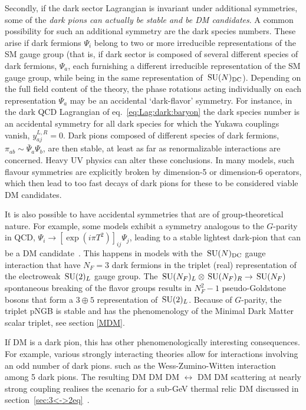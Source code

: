 Secondly, if the dark sector Lagrangian is invariant under additional symmetries, some of the {\em dark pions can actually be stable and be DM candidates}.
A common possibility for such an additional symmetry are the dark species numbers. 
These arise if dark fermions $\Psi_i$ belong to two or more irreducible representations of the SM gauge group 
(that is, if dark sector is composed of several different species  of dark fermions, $\Psi_a$, each furnishing a different irreducible representation of the SM gauge group, while being in the same representation of $\,{\rm SU}(N)_{\rm DC}$). 
Depending on the full field content of the theory, the phase rotations acting individually on each representation $\Psi_a$ may be an accidental  `dark-flavor' symmetry. 
For instance, in the dark QCD Lagrangian of eq.~\eqref{eq:Lag:dark:baryon} 
the dark species number is an accidental symmetry for all dark species for which 
the Yukawa couplings vanish, $y_{aj}^{L,R}=0$.
Dark pions composed of different species of dark fermions, $\pi_{ab}\sim \bar{\Psi}_a \Psi_b$, are then stable, 
at least as far as renormalizable interactions are concerned.
Heavy UV physics can alter these conclusions. 
In many models, such flavour symmetries are explicitly broken by 
 dimension-5 or dimension-6 operators, which then lead to too fast decays of dark pions for these to be considered viable DM candidates. 

\smallskip

It is also possible to have accidental symmetries that are of group-theoretical nature.
For example, some models exhibit a symmetry analogous to the $G$-parity in QCD,
$\Psi_i \to [\exp(i \pi T^2)]_{ij}\Psi_j$, leading to a stable lightest dark-pion that can be a DM candidate~\cite{BaryonicDM}.
This happens in models with the
$\,{\rm SU}(N)_{\rm DC}$ gauge interaction that have $N_F=3$ dark fermions 
in the  triplet (real) representation of the electroweak $\,{\rm SU}(2)_L$ gauge group.
The $\,{\rm SU}(N_F)_L\otimes \,{\rm SU}(N_F)_R\to \,{\rm SU}(N_F)$ spontaneous breaking of the  flavor groups results in $N_F^2-1$ pseudo-Goldstone bosons that form a $3\oplus 5$ representation of $\,{\rm SU}(2)_L$.
 Because of $G$-parity, the triplet pNGB is stable and has the phenomenology of the Minimal Dark Matter scalar triplet, see section \ref{MDM}.


If DM is a dark pion, this has other phenomenologically interesting consequences. 
For example, various strongly interacting theories allow for interactions involving an odd number of dark pions.
such as the  Wess-Zumino-Witten interaction among 5 dark pions.
The resulting DM DM DM $\leftrightarrow$ DM DM scattering at nearly strong coupling
realises the scenario for a sub-GeV thermal relic DM discussed in section~\ref{sec:3<->2eq}~\cite{MeVDM}.



